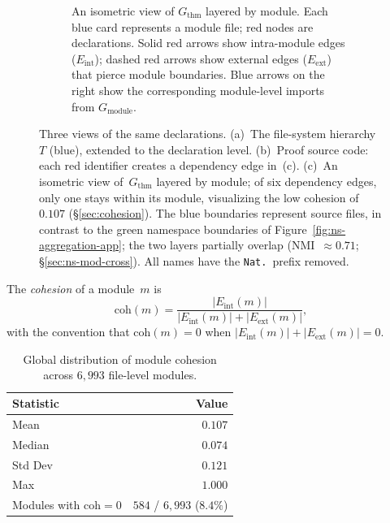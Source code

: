 \begin{figure}[H]
\begin{subfigure}[b]{\textwidth}
\begin{tikzpicture}
\end{tikzpicture}
\caption{An isometric view of $G_{\mathrm{thm}}$ layered by module. Each \textcolor{blue!60!black}{blue card} represents a module file; \textcolor{red!70!black}{red nodes} are declarations. Solid \textcolor{red!70!black}{red arrows} show intra-module edges ($E_{\mathrm{int}}$); dashed \textcolor{red!70!black}{red arrows} show external edges ($E_{\mathrm{ext}}$) that pierce module boundaries. \textcolor{blue!60!black}{Blue arrows} on the right show the corresponding module-level imports from $G_{\mathrm{module}}$.}
\label{fig:dep-view-app}
\end{subfigure}
\caption{Three views of the same declarations. (a)~The file-system hierarchy~$T$ (\textcolor{blue!60!black}{blue}), extended to the declaration level. (b)~Proof source code: each \textcolor{red!70!black}{red identifier} creates a dependency edge in~(c). (c)~An isometric view of~$G_{\mathrm{thm}}$ layered by module; of six dependency edges, only one stays within its module, visualizing the low cohesion of~$0.107$ (\S\ref{sec:cohesion}). The \textcolor{blue!60!black}{blue} boundaries represent source files, in contrast to the \textcolor{green!40!black}{green} namespace boundaries of Figure~\ref{fig:ns-aggregation-app}; the two layers partially overlap (NMI~$\approx 0.71$; \S\ref{sec:ns-mod-cross}). All names have the \texttt{Nat.}\ prefix removed.}
\label{fig:module-region-app}
\end{figure}

\begin{definition}\label{def:cohesion}
The \emph{cohesion} of a module~$m$ is
\[
  \mathrm{coh}(m) = \frac{|E_{\mathrm{int}}(m)|}{|E_{\mathrm{int}}(m)| + |E_{\mathrm{ext}}(m)|},
\]
with the convention that $\mathrm{coh}(m) = 0$ when $|E_{\mathrm{int}}(m)| + |E_{\mathrm{ext}}(m)| = 0$.
\end{definition}

\begin{table}[ht]
\centering
\caption{Global distribution of module cohesion across $6{,}993$ file-level modules.}
\label{tab:cohesion-global}
\begin{tabular}{lr}
\toprule
Statistic & Value \\
\midrule
Mean       & $0.107$ \\
Median     & $0.074$ \\
Std Dev    & $0.121$ \\
Max        & $1.000$ \\
Modules with $\mathrm{coh} = 0$ & $584$ / $6{,}993$ ($8.4\%$) \\
\bottomrule
\end{tabular}
\end{table}


